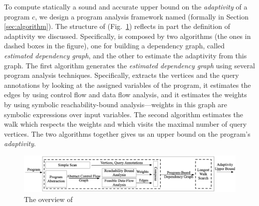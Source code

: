 To compute statically a sound and accurate upper bound on the \emph{adaptivity} of a program $c$,
we design a program analysis framework named {\THESYSTEM} (formally in Section \ref{sec:algorithm}). 
The structure of {\THESYSTEM} (Fig.~\ref{fig:adaptfun}) reflects in part the definition of adaptivity we discussed. Specifically, {\THESYSTEM} is composed by two algorithms (the ones in dashed boxes in the figure), one for building a dependency graph, called \emph{estimated dependency graph}, and the other to estimate the adaptivity from this graph.  
The first algorithm generates the \emph{estimated dependency graph} using several program analysis techniques. Specifically,
 {\THESYSTEM} extracts the vertices and the query annotations by looking at the assigned variables of the program, it estimates the edges by using control flow and data flow analysis, and it estimates the weights by using symbolic reachability-bound analysis---weights in this graph are symbolic expressions over input variables. 
The second algorithm estimates the
walk which respects the weights and which visits the maximal number of query vertices.
The two algorithms together gives us an  upper bound on the program's \emph{adaptivity}.

 \begin{figure}
  \centering    
\includegraphics[width=1.0\columnwidth]{adapfun.png}
  \caption{The overview of {\THESYSTEM}}
  \label{fig:adaptfun}
\end{figure}

